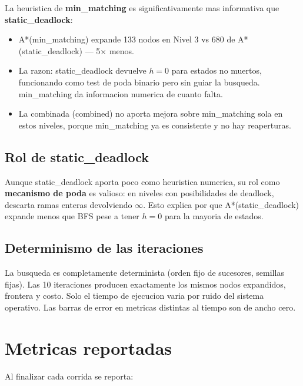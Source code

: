 \documentclass[12pt, a4paper]{article}
\begin{document}
La heuristica de \textbf{min\_matching} es significativamente mas informativa que \textbf{static\_deadlock}:

\begin{itemize}
  \item A*(min\_matching) expande 133 nodos en Nivel 3 vs 680 de A*(static\_deadlock) --- 5$\times$ menos.
  \item La razon: static\_deadlock devuelve $h=0$ para estados no muertos, funcionando como test de poda binario pero sin guiar la busqueda. min\_matching da informacion numerica de cuanto falta.
  \item La combinada (combined) no aporta mejora sobre min\_matching sola en estos niveles, porque min\_matching ya es consistente y no hay reaperturas.
\end{itemize}

\subsection{Rol de static\_deadlock}

Aunque static\_deadlock aporta poco como heuristica numerica, su rol como \textbf{mecanismo de poda} es valioso: en niveles con posibilidades de deadlock, descarta ramas enteras devolviendo $\infty$. Esto explica por que A*(static\_deadlock) expande menos que BFS pese a tener $h=0$ para la mayoria de estados.

\subsection{Determinismo de las iteraciones}

La busqueda es completamente determinista (orden fijo de sucesores, semillas fijas). Las 10 iteraciones producen exactamente los mismos nodos expandidos, frontera y costo. Solo el tiempo de ejecucion varia por ruido del sistema operativo. Las barras de error en metricas distintas al tiempo son de ancho cero.

\section{Metricas reportadas}

Al finalizar cada corrida se reporta:
\end{document}
